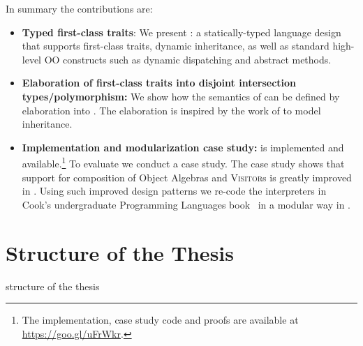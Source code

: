 In summary the contributions are:
\begin{itemize}

\item \textbf{Typed first-class traits}: We present \sedel: a statically-typed
  language design that supports first-class traits, dynamic
  inheritance, as well as standard high-level OO constructs such as
  dynamic dispatching and abstract methods.


\item \textbf{Elaboration of first-class traits into disjoint intersection
    types/polymorphism:} We show how the semantics of \sedel can be defined by
  elaboration into \fnamee. The elaboration is inspired by the work of
  \citet{cook1989denotational} to model inheritance.


\item \textbf{Implementation and modularization case study:} \sedel is implemented
  and available.\footnote{The implementation, case study code and proofs are available at \url{https://goo.gl/uFrWkr}.} To
  evaluate \sedel we conduct a case study. The case study shows that support for
  composition of Object Algebras and \textsc{Visitor}s is greatly improved in \sedel.
  Using such improved design patterns we re-code the interpreters in
  Cook's undergraduate Programming Languages book~\citep{poplcook} in
  a modular way in \sedel.

\end{itemize}


\section{Structure of the Thesis}

structure of the thesis


